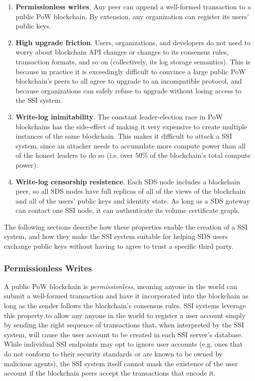 \begin{enumerate}
   \item \textbf{Permissionless writes}.  Any peer can append a well-formed transaction 
      to a public PoW blockchain.  By extension, any organization can register
      its users' public keys.
   \item \textbf{High upgrade friction}.  Users, organizations, and developers do not
      need to worry about blockchain API changes or changes to its consensus
      rules, transaction formats, and so on (collectively, its log storage
      semantics).  This is because in practice it is exceedingly difficult to
      convince a large public PoW blockchain's peers to all agree to upgrade to an
      incompatible protocol, and because organizations can safely refuse to
      upgrade without losing access to the SSI system.
   \item \textbf{Write-log inimitability}.  The constant leader-election race in PoW
      blockchains has the side-effect of making it very expensive to create
      multiple instances of the same blockchain.  This makes it difficult to
      attack a SSI system, since an attacker needs to accumulate more compute
      power than all of the honest leaders to do so (i.e. over 50\% of the blockchain's
      total compute power).
   \item \textbf{Write-log censorship resistence}.  Each SDS node includes a blockchain
      peer, so all SDS nodes have full replicas of all of the views of the
      blockchain and all of the users' public keys and identity state.
      As long as a SDS gateway can contact one SSI node, it can authenticate its volume
      certificate graph.
\end{enumerate}

The following sections describe how these properties enable the creation of a
SSI system, and how they make the SSI system suitable for helping SDS users
exchange public keys without having to agree to trust a specific third party.

\subsubsection{Permissionless Writes}

A public PoW blockchain is \emph{permissionless}, meaning anyone in the world can submit a
well-formed transaction and have it incorporated into the blockchain as
long as the sender follows the blockchain's consensus rules.
SSI systems leverage this property to allow any anyone in the world to register a user account
simply by sending the right sequence of transactions that, when interpreted by the SSI system, will
cause the user account to be created in each SSI server's database.
While individual SSI endpoints may opt to ignore user accounts (e.g. ones that do not conform to their security
standards or are known to be owned by malicious agents), the SSI system itself cannot
mask the existence of the user account if the blockchain peers accept the
transactions that encode it.

